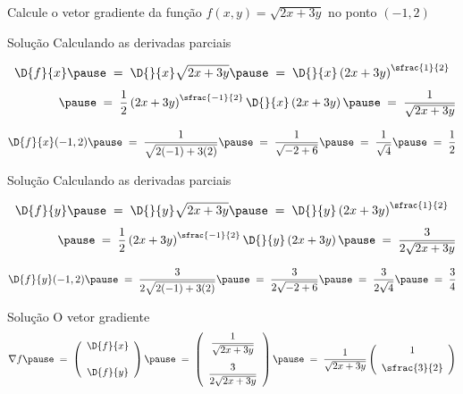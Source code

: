 \begin{question}
  Calcule o vetor gradiente da função \(f(x, y) = \sqrt{2x+3y}\)
  no ponto \((-1, 2)\)
\end{question}

\begin{resolution}{Solução}
  Calculando as derivadas parciais

  \pause
  \[
    \D{f}{x}
    \pause
    \;=\; \D{}{x}\sqrt{2x+3y}
    \pause
    \;=\; \D{}{x}\left(2x+3y\right)^{\sfrac{1}{2}}
  \]
  \[
    \hphantom{\D{f}{x}}
    \pause
    \;=\; \frac{1}{2}\left(2x+3y\right)^{\sfrac{-1}{2}}\D{}{x}\left(2x+3y\right)
    \pause
    \;=\; \frac{1}{\sqrt{2x+3y}}
  \]

  \pause
  \[
    \D{f}{x}(-1, 2)
    \pause
    \;=\; \frac{1}{\sqrt{2(-1)+3(2)}}
    \pause
    \;=\; \frac{1}{\sqrt{-2+6}}
    \pause
    \;=\; \frac{1}{\sqrt{4}}
    \pause
    \;=\; \frac{1}{2}
  \]
\end{resolution}

\begin{resolution}{Solução}
  Calculando as derivadas parciais

  \pause
  \[
    \D{f}{y}
    \pause
    \;=\; \D{}{y}\sqrt{2x+3y}
    \pause
    \;=\; \D{}{y}\left(2x+3y\right)^{\sfrac{1}{2}}
  \]
  \[
    \hphantom{\D{f}{y}}
    \pause
    \;=\; \frac{1}{2}\left(2x+3y\right)^{\sfrac{-1}{2}}\D{}{y}\left(2x+3y\right)
    \pause
    \;=\; \frac{3}{2\sqrt{2x+3y}}
  \]

  \pause
  \[
    \D{f}{y}(-1, 2)
    \pause
    \;=\; \frac{3}{2\sqrt{2(-1)+3(2)}}
    \pause
    \;=\; \frac{3}{2\sqrt{-2+6}}
    \pause
    \;=\; \frac{3}{2\sqrt{4}}
    \pause
    \;=\; \frac{3}{4}
  \]
\end{resolution}

\begin{resolution}{Solução}
  O vetor gradiente
  \[
    \nabla f
    \pause
    \;=\; \left(\begin{array}{c}
        \displaystyle\D{f}{x} \\[5mm]
        \displaystyle\D{f}{y}
      \end{array}\right)
    \pause
    \;=\; \left(\begin{array}{c}
             \dfrac{1}{\sqrt{2x+3y}} \\[5mm]
             \dfrac{3}{2\sqrt{2x+3y}}
          \end{array}\right)
    \pause
    \;=\; \frac{1}{\sqrt{2x+3y}} \left(\begin{array}{c}
            1 \\[2mm]
            \sfrac{3}{2}
          \end{array}\right)
  \]
\end{resolution}

